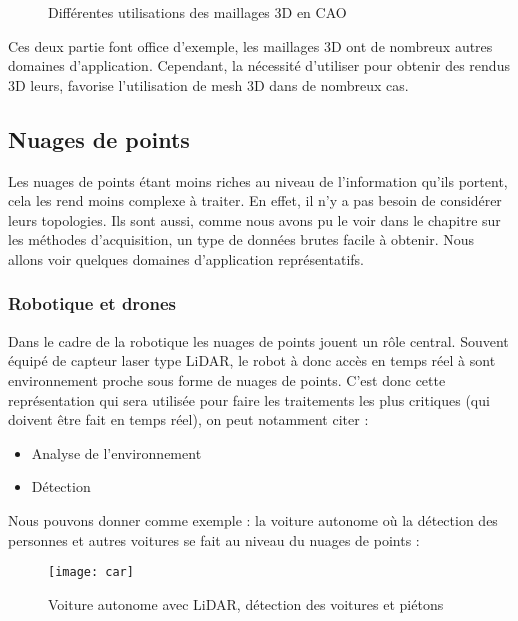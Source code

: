 \begin{figure}[h]
    \centering
    \qquad
    \caption{Différentes utilisations des maillages 3D en CAO}
    \label{fig:CATIA}
\end{figure}
\FloatBarrier

Ces deux partie font office d'exemple, les maillages 3D ont de nombreux autres domaines d'application. Cependant, la nécessité d'utiliser pour obtenir des rendus 3D leurs, favorise l'utilisation de mesh 3D dans de nombreux cas.


\subsection{Nuages de points}
Les nuages de points étant moins riches au niveau de l'information qu'ils portent, cela les rend moins complexe à traiter. En effet, il n'y a pas besoin de considérer leurs topologies. Ils sont aussi, comme nous avons pu le voir dans le chapitre sur les méthodes d'acquisition, un type de données brutes facile à obtenir. Nous allons voir quelques domaines d'application représentatifs.

\subsubsection{Robotique et drones}
Dans le cadre de la robotique les nuages de points jouent un rôle central. Souvent équipé de capteur laser type LiDAR, le robot à donc accès en temps réel à sont environnement proche sous forme de nuages de points. C'est donc cette représentation qui sera utilisée pour faire les traitements les plus critiques (qui doivent être fait en temps réel), on peut notamment citer :
\begin{itemize}
    \item Analyse de l'environnement
    \item Détection
\end{itemize}
Nous pouvons donner comme exemple : la voiture autonome où la détection des personnes et autres voitures se fait au niveau du nuages de points :

\begin{figure}[h]
    \centering
    \texttt{[image: car]}
    \caption{Voiture autonome avec LiDAR, détection des voitures et piétons}
    \label{fig:car}
\end{figure}
\FloatBarrier

